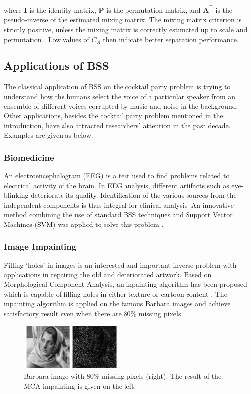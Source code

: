 where $\mathbf{I}$ is the identity matrix, $\mathbf{P}$ is the permutation matrix, and $\tilde{\mathbf{A}}^{+}$ is the pseudo-inverse of the estimated mixing matrix. The mixing matrix criterion is strictly positive, unless the mixing matrix is correctly estimated up to scale and permutation \cite{VAbolghasemi2012}. Low values of $C_A$ then indicate better separation performance.
 
\subsection{Applications of BSS}
The classical application of BSS on the cocktail party problem is trying to understand how the humans select the voice of a particular speaker from an ensemble of different voices corrupted by music and noise in the background. Other applications, besides the cocktail party problem mentioned in the introduction, have also attracted researchers' attention in the past decade. Examples are given as below.

\subsubsection{Biomedicine}
An electroencephalogram (EEG) is a test used to find problems related to electrical activity of the brain. In EEG analysis, different artifacts such as eye-blinking deteriorate its quality. Identification of the various sources from the independent components is thus integral for clinical analysis. An innovative method combining the use of standard BSS techniques and Support Vector Machines (SVM) was applied to solve this problem  \cite{Duda2000PC954544}.

\subsubsection{Image Impainting}
Filling `holes' in images is an interested and important inverse problem with applications in repairing the old and deteriorated artwork. Based on Morphological Component Analysis, an inpainting algorithm has been proposed  which is capable of filling holes in either texture or cartoon content \cite{ELAD2005340}. The inpainting algorithm is applied on the famous Barbara images and achieve satisfactory result even when there are 80\% missing pixels. 
\begin{figure}[H]
\centering
\includegraphics[width=0.45\textwidth]{images/impainting1.png}
\caption{Barbara image with $80\%$ missing pixels (right). The result of the MCA impainting is
given on the left.}
\label{imapint1}
\end{figure}


